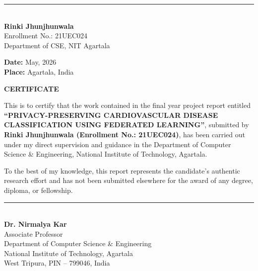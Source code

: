 \documentclass[12pt,a4paper,oneside]{report}
\begin{document}
\vspace{2.5in}

\begin{flushright}
    \rule{6cm}{0.4pt}\\
    \textbf{Rinki Jhunjhunwala}\\
    Enrollment No.: 21UEC024\\
    Department of CSE, NIT Agartala
\end{flushright}

\vspace{0.8cm}
\noindent \textbf{Date:} May, 2026\\
\noindent \textbf{Place:} Agartala, India

\cleardoublepage
\thispagestyle{plain}
\begin{center}
    \vspace*{0.5in}
    {\Large \textbf{CERTIFICATE}\par}
    \vspace{0.8in}
\end{center}

\noindent This is to certify that the work contained in the final year project report entitled \textbf{``PRIVACY-PRESERVING CARDIOVASCULAR DISEASE CLASSIFICATION USING FEDERATED LEARNING''}, submitted by \textbf{Rinki Jhunjhunwala (Enrollment No.: 21UEC024)}, has been carried out under my direct supervision and guidance in the Department of Computer Science \& Engineering, National Institute of Technology, Agartala.

\vspace{0.5cm}
\noindent To the best of my knowledge, this report represents the candidate's authentic research effort and has not been submitted elsewhere for the award of any degree, diploma, or fellowship.

\vspace{3.0in}

\begin{flushright}
    \rule{6.5cm}{0.4pt}\\
    \textbf{Dr. Nirmalya Kar}\\
    Associate Professor\\
    Department of Computer Science \& Engineering\\
    National Institute of Technology, Agartala\\
    West Tripura, PIN -- 799046, India
\end{flushright}
\end{document}

